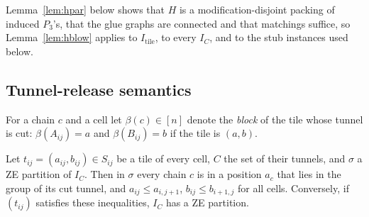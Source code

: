 Lemma~\ref{lem:hpar} below shows that $H$ is a modification-disjoint packing of induced $P_3$'s, that the glue graphs are connected and that matchings suffice, so Lemma~\ref{lem:hblow} applies to $I_{\mathrm{tile}}$, to every $I_C$, and to the stub instances used below.

\subsection{Tunnel-release semantics}\label{sec:hTR}
For a chain $c$ and a cell let $\beta(c)\in[n]$ denote the \emph{block} of the tile whose tunnel is cut: $\beta(A_{ij})=a$ and $\beta(B_{ij})=b$ if the tile is $(a,b)$.

\begin{proposition}\label{prop:hTR}
Let $t_{ij}=(a_{ij},b_{ij})\in S_{ij}$ be a tile of every cell, $C$ the set of their tunnels, and $\sigma$ a ZE partition of $I_C$. Then in $\sigma$ every chain $c$ is in a position $a_c$ that lies in the group of its cut tunnel, and $a_{ij}\le a_{i,j+1}$, $b_{ij}\le b_{i+1,j}$ for all cells. Conversely, if $(t_{ij})$ satisfies these inequalities, $I_C$ has a ZE partition.
\end{proposition}
